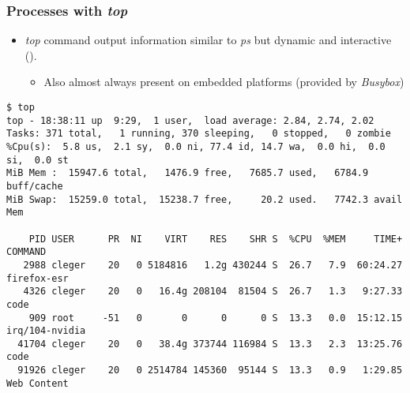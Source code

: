 \begin{frame}[fragile]
  \frametitle{Processes with {\em top}}
  \begin{itemize}
    \item {\em top} command output information similar to {\em ps} but dynamic
          and interactive ().
    \begin{itemize}
      \item Also almost always present on embedded platforms (provided by
            {\em Busybox})
    \end{itemize}
  \end{itemize}
  \begin{block}{}
    \begin{verbatim}
$ top
top - 18:38:11 up  9:29,  1 user,  load average: 2.84, 2.74, 2.02
Tasks: 371 total,   1 running, 370 sleeping,   0 stopped,   0 zombie
%Cpu(s):  5.8 us,  2.1 sy,  0.0 ni, 77.4 id, 14.7 wa,  0.0 hi,  0.0 si,  0.0 st
MiB Mem :  15947.6 total,   1476.9 free,   7685.7 used,   6784.9 buff/cache
MiB Swap:  15259.0 total,  15238.7 free,     20.2 used.   7742.3 avail Mem

    PID USER      PR  NI    VIRT    RES    SHR S  %CPU  %MEM     TIME+ COMMAND
   2988 cleger    20   0 5184816   1.2g 430244 S  26.7   7.9  60:24.27 firefox-esr
   4326 cleger    20   0   16.4g 208104  81504 S  26.7   1.3   9:27.33 code
    909 root     -51   0       0      0      0 S  13.3   0.0  15:12.15 irq/104-nvidia
  41704 cleger    20   0   38.4g 373744 116984 S  13.3   2.3  13:25.76 code
  91926 cleger    20   0 2514784 145360  95144 S  13.3   0.9   1:29.85 Web Content
    \end{verbatim}
  \end{block}
\end{frame}

